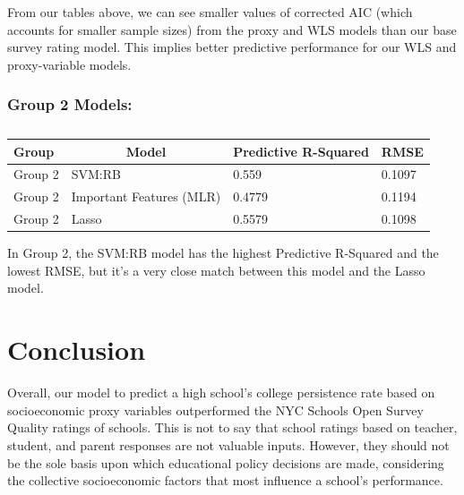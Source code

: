 \documentclass[
  man,floatsintext]{apa6}
\begin{document}
From our tables above, we can see smaller values of corrected AIC (which accounts for smaller sample sizes) from the proxy and WLS models than our base survey rating model. This implies better predictive performance for our WLS and proxy-variable models.

\hypertarget{group-2-models}{%
\subsubsection{Group 2 Models:}\label{group-2-models}}

\begin{table}[H]

\begin{center}
\begin{threeparttable}

\caption{\label{tab:unnamed-chunk-14}}

\begin{tabular}{llll}
\toprule
Group & \multicolumn{1}{c}{Model} & \multicolumn{1}{c}{Predictive R-Squared} & \multicolumn{1}{c}{RMSE}\\
\midrule
Group 2 & SVM:RB & 0.559 & 0.1097\\
Group 2 & Important Features (MLR) & 0.4779 & 0.1194\\
Group 2 & Lasso & 0.5579 & 0.1098\\
\bottomrule
\end{tabular}

\end{threeparttable}
\end{center}

\end{table}

In Group 2, the SVM:RB model has the highest Predictive R-Squared and the lowest RMSE, but it's a very close match between this model and the Lasso model.

\hypertarget{conclusion}{%
\section{Conclusion}\label{conclusion}}

Overall, our model to predict a high school's college persistence rate based on socioeconomic proxy variables outperformed the NYC Schools Open Survey Quality ratings of schools. This is not to say that school ratings based on teacher, student, and parent responses are not valuable inputs. However, they should not be the sole basis upon which educational policy decisions are made, considering the collective socioeconomic factors that most influence a school's performance.
\end{document}
